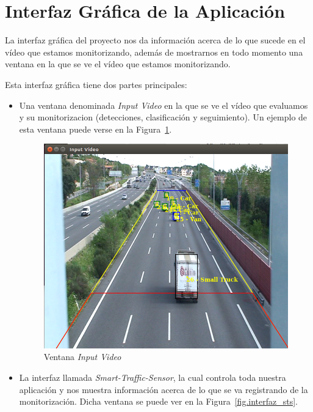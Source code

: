 \section{Interfaz Gráfica de la Aplicación}

La interfaz gráfica del proyecto nos da información acerca de lo que sucede en el vídeo que estamos monitorizando, además de mostrarnos en todo momento una ventana en la que se ve el vídeo que estamos monitorizando.

Esta interfaz gráfica tiene dos partes principales:
\begin{itemize}
    \item Una ventana denominada \textit{Input Video} en la que se ve el vídeo que evaluamos y su monitorizacion (detecciones, clasificación y seguimiento). Un ejemplo de esta ventana puede verse en la Figura~\ref{fig.input_video}.
     \begin{figure}[H] 
    \begin{center}
    	\includegraphics[scale=0.4]{figures/Diseno_global/sts_buena.png}
       \caption{Ventana \textit{Input Video}}
    	\label{fig.input_video}
    \end{center}
    \end{figure}
    \item La interfaz llamada \textit{Smart-Traffic-Sensor}, la cual controla toda nuestra aplicación y nos muestra información acerca de lo que se va registrando de la monitorización. Dicha ventana se puede ver en la Figura~\ref{fig.interfaz_sts}.
     \begin{figure}[H] 

\end{figure}
\end{itemize}
